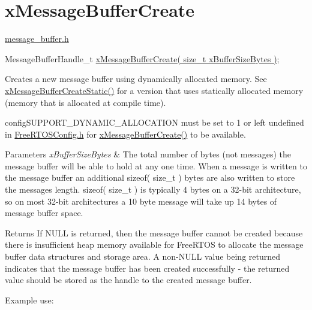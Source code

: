 \hypertarget{group__x_message_buffer_create}{}\section{x\+Message\+Buffer\+Create}
\label{group__x_message_buffer_create}
\hyperlink{message__buffer_8h}{message\+\_\+buffer.\+h}


\begin{DoxyPre}
MessageBufferHandle\_t \hyperlink{message__buffer_8h_a2959cd0e3d2bd20d46908e5c9872be36}{xMessageBufferCreate( size\_t xBufferSizeBytes )};
\end{DoxyPre}


Creates a new message buffer using dynamically allocated memory. See \hyperlink{message__buffer_8h_acc84f4a15dbd39ecbad35f7337e78b2c}{x\+Message\+Buffer\+Create\+Static()} for a version that uses statically allocated memory (memory that is allocated at compile time).

config\+S\+U\+P\+P\+O\+R\+T\+\_\+\+D\+Y\+N\+A\+M\+I\+C\+\_\+\+A\+L\+L\+O\+C\+A\+T\+I\+ON must be set to 1 or left undefined in \hyperlink{_free_r_t_o_s_config_8h}{Free\+R\+T\+O\+S\+Config.\+h} for \hyperlink{message__buffer_8h_a2959cd0e3d2bd20d46908e5c9872be36}{x\+Message\+Buffer\+Create()} to be available.


\begin{DoxyParams}{Parameters}
{\em x\+Buffer\+Size\+Bytes} & The total number of bytes (not messages) the message buffer will be able to hold at any one time. When a message is written to the message buffer an additional sizeof( size\+\_\+t ) bytes are also written to store the message\textquotesingle{}s length. sizeof( size\+\_\+t ) is typically 4 bytes on a 32-\/bit architecture, so on most 32-\/bit architectures a 10 byte message will take up 14 bytes of message buffer space.\\
\hline
\end{DoxyParams}
\begin{DoxyReturn}{Returns}
If N\+U\+LL is returned, then the message buffer cannot be created because there is insufficient heap memory available for Free\+R\+T\+OS to allocate the message buffer data structures and storage area. A non-\/\+N\+U\+LL value being returned indicates that the message buffer has been created successfully -\/ the returned value should be stored as the handle to the created message buffer.
\end{DoxyReturn}
Example use\+: 
\begin{DoxyPre}\end{DoxyPre}



